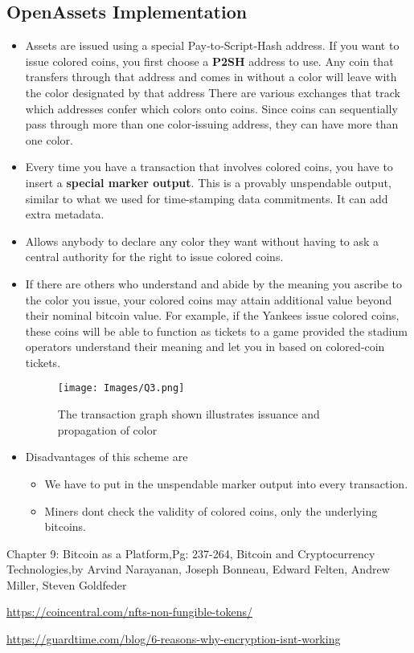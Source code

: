 \documentclass[10pt,a4paper]{article}
\begin{document}
\subsection{OpenAssets Implementation}
\begin{itemize}
\item Assets are issued using a special Pay‐to‐Script‐Hash address. If you want to issue colored coins, you first choose a \textbf{P2SH} address to use. Any coin that transfers through that address and comes in without a color will leave with the color designated by that address There are various exchanges that track which addresses confer which colors onto coins. Since coins can sequentially pass through more than one color‐issuing address, they can have more than one color.
\item Every time you have a transaction that involves colored coins, you have to insert a\textbf{ special marker output}. This is a provably unspendable output, similar to what we used for time-stamping data commitments. It can add extra metadata. 
\item Allows anybody to declare any color they want without having to ask a central authority for the right to issue colored coins.
\item If there are others who understand and abide by the meaning you ascribe to the color you issue, your colored coins may attain additional value beyond their nominal bitcoin value. For example, if the Yankees issue colored coins, these coins will be able to function as tickets to a game provided the stadium operators understand their meaning and let you in based on colored‐coin tickets.
\begin{figure}[H]
  \centering
  \texttt{[image: Images/Q3.png]}
  \caption{The transaction graph shown illustrates issuance and propagation of color \protect\footnotemark }
  \label{fig:coloredcoins}
\end{figure}

\item Disadvantages of this scheme are
\begin{itemize}
\item We have to put in the unspendable marker output into every transaction.
\item Miners don\textquotesingle t check the validity of colored coins, only the underlying bitcoins.
\end{itemize}
\end{itemize}
\begin{thebibliography}{9}


Chapter 9: Bitcoin as a Platform,Pg: 237-264, Bitcoin and Cryptocurrency Technologies,by  Arvind Narayanan, Joseph Bonneau, Edward Felten,
Andrew Miller, Steven Goldfeder

 \url{https://coincentral.com/nfts-non-fungible-tokens/}

 \url{https://guardtime.com/blog/6-reasons-why-encryption-isnt-working}


\end{thebibliography}



\end{document}
